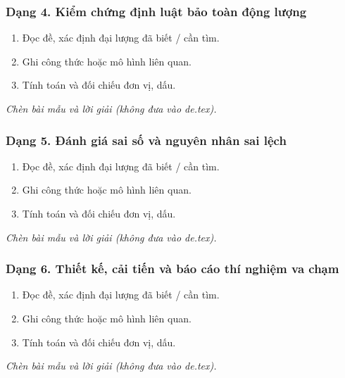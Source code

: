 \subsubsection{Dạng 4. Kiểm chứng định luật bảo toàn động lượng}
\begin{phuongphap}
\begin{enumerate}
\item Đọc đề, xác định đại lượng đã biết / cần tìm.
\item Ghi công thức hoặc mô hình liên quan.
\item Tính toán và đối chiếu đơn vị, dấu.
\end{enumerate}
\end{phuongphap}
\begin{vidumau}
\textit{Chèn bài mẫu và lời giải (không đưa vào de.tex).}
\end{vidumau}

\subsubsection{Dạng 5. Đánh giá sai số và nguyên nhân sai lệch}
\begin{phuongphap}
\begin{enumerate}
\item Đọc đề, xác định đại lượng đã biết / cần tìm.
\item Ghi công thức hoặc mô hình liên quan.
\item Tính toán và đối chiếu đơn vị, dấu.
\end{enumerate}
\end{phuongphap}
\begin{vidumau}
\textit{Chèn bài mẫu và lời giải (không đưa vào de.tex).}
\end{vidumau}

\subsubsection{Dạng 6. Thiết kế, cải tiến và báo cáo thí nghiệm va chạm}
\begin{phuongphap}
\begin{enumerate}
\item Đọc đề, xác định đại lượng đã biết / cần tìm.
\item Ghi công thức hoặc mô hình liên quan.
\item Tính toán và đối chiếu đơn vị, dấu.
\end{enumerate}
\end{phuongphap}
\begin{vidumau}
\textit{Chèn bài mẫu và lời giải (không đưa vào de.tex).}
\end{vidumau}

